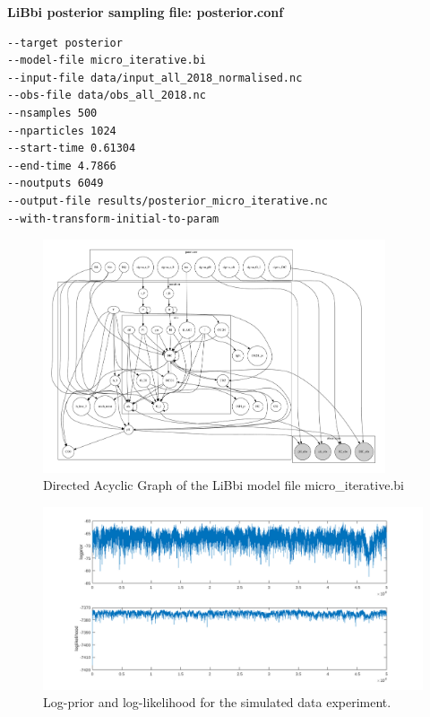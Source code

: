 \documentclass{ruthesis}
\begin{document}
\textbf{LiBbi posterior sampling file: posterior.conf}
\begin{lstlisting}
--target posterior
--model-file micro_iterative.bi
--input-file data/input_all_2018_normalised.nc
--obs-file data/obs_all_2018.nc
--nsamples 500
--nparticles 1024
--start-time 0.61304
--end-time 4.7866
--noutputs 6049
--output-file results/posterior_micro_iterative.nc
--with-transform-initial-to-param
\end{lstlisting}

\begin{figure}
	\centerline{\includegraphics[width=0.9\textwidth]{images_microalgae/micro_template.pdf}}
	\caption[.]{Directed Acyclic Graph of the LiBbi model file micro\_iterative.bi}
	\label{fig:micro_DAG}
\end{figure}


\begin{figure}
	\centerline{\includegraphics[width=1.3\textwidth]{images_microalgae/posterior_plots_with_fake_data/loglikelihood}}
	\caption[.]{Log-prior and log-likelihood for the simulated data experiment.}
	\label{fig:micro_sim_loglikelihood}
\end{figure}
\end{document}
